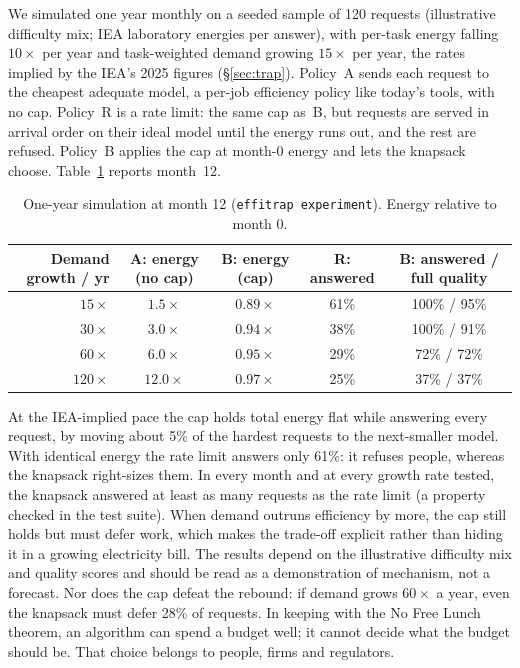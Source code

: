 \documentclass[11pt]{article}
\theoremstyle{definition}
\theoremstyle{remark}
\begin{document}
We simulated one year monthly on a seeded sample of 120 requests (illustrative difficulty mix; IEA laboratory energies per answer), with per-task energy falling $10\times$ per year and task-weighted demand growing $15\times$ per year, the rates implied by the IEA's 2025 figures (\S\ref{sec:trap}). Policy~A sends each request to the cheapest adequate model, a per-job efficiency policy like today's tools, with no cap. Policy~R is a rate limit: the same cap as~B, but requests are served in arrival order on their ideal model until the energy runs out, and the rest are refused. Policy~B applies the cap at month-0 energy and lets the knapsack choose. Table~\ref{tab:cap} reports month~12.

\begin{table}[h]
\centering\small
\caption{One-year simulation at month 12 (\texttt{effitrap experiment}). Energy relative to month 0.}
\label{tab:cap}
\begin{tabular}{@{}rcccc@{}}
\toprule
Demand growth / yr & A: energy (no cap) & B: energy (cap) & R: answered & B: answered / full quality \\
\midrule
$15\times$ & $1.5\times$ & $0.89\times$ & 61\% & 100\% / 95\% \\
$30\times$ & $3.0\times$ & $0.94\times$ & 38\% & 100\% / 91\% \\
$60\times$ & $6.0\times$ & $0.95\times$ & 29\% & 72\% / 72\% \\
$120\times$ & $12.0\times$ & $0.97\times$ & 25\% & 37\% / 37\% \\
\bottomrule
\end{tabular}
\end{table}

At the IEA-implied pace the cap holds total energy flat while answering every request, by moving about 5\% of the hardest requests to the next-smaller model. With identical energy the rate limit answers only 61\%: it refuses people, whereas the knapsack right-sizes them. In every month and at every growth rate tested, the knapsack answered at least as many requests as the rate limit (a property checked in the test suite). When demand outruns efficiency by more, the cap still holds but must defer work, which makes the trade-off explicit rather than hiding it in a growing electricity bill. The results depend on the illustrative difficulty mix and quality scores and should be read as a demonstration of mechanism, not a forecast. Nor does the cap defeat the rebound: if demand grows $60\times$ a year, even the knapsack must defer 28\% of requests. In keeping with the No Free Lunch theorem, an algorithm can spend a budget well; it cannot decide what the budget should be. That choice belongs to people, firms and regulators.
\end{document}
